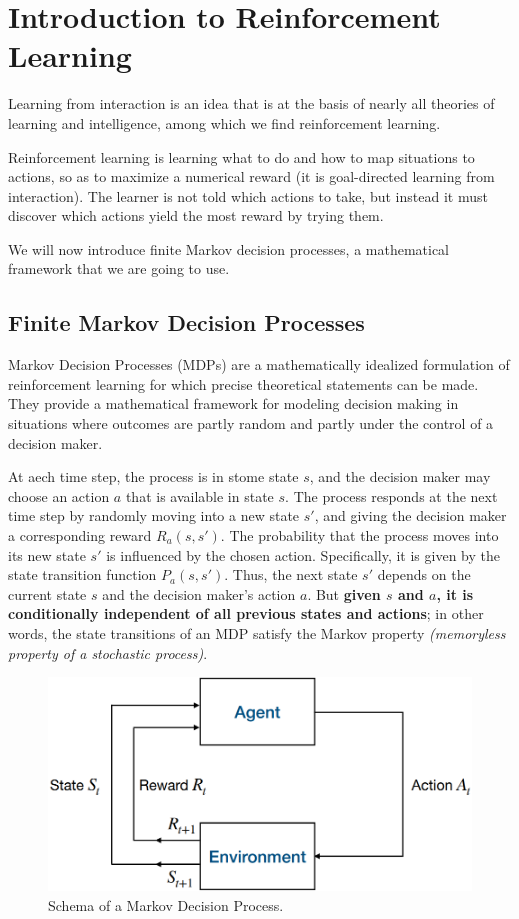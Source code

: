 \section{Introduction to Reinforcement Learning}
Learning from interaction is an idea that is at the basis of nearly all theories of learning and intelligence, among which we find reinforcement learning.

Reinforcement learning is learning what to do and how to map situations to actions, so as to maximize a numerical reward (it is goal-directed learning from interaction). The learner is not told which actions to take, but instead it must discover which actions yield the most reward by trying them.

We will now introduce finite Markov decision processes, a mathematical framework that we are going to use.

\subsection{Finite Markov Decision Processes}
Markov Decision Processes (MDPs) are a mathematically idealized formulation of reinforcement learning for which precise theoretical statements can be made. They provide a mathematical framework for modeling decision making in situations where outcomes are partly random and partly under the control of a decision maker.

At aech time step, the process is in stome state $s$, and the decision maker may choose an action $a$ that is available in state $s$. The process responds at the next time step by randomly moving into a new state $s'$, and giving the decision maker a corresponding reward $R_a(s,s')$. The probability that the process moves into its new state $s'$ is influenced by the chosen action. Specifically, it is given by the state transition function $P_a(s,s')$. Thus, the next state $s'$ depends on the current state $s$ and the decision maker's action $a$. But \textbf{given $s$ and $a$, it is conditionally independent of all previous states and actions}; in other words, the state transitions of an MDP satisfy the Markov property \textit{(memoryless property of a stochastic process)}.

\begin{figure}[hbt]
    \centering
    \includegraphics[width=\textwidth]{Images/Chapter 2/mdp.png}
    \caption{Schema of a Markov Decision Process.}
    \label{fig:ch2-mdp}
\end{figure}

